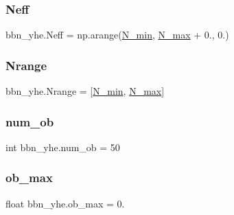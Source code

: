 \subsubsection{\texorpdfstring{Neff}{Neff}}
{\footnotesize\ttfamily bbn\+\_\+yhe.\+Neff = np.\+arange(\mbox{\hyperlink{namespacebbn__yhe_a12d17f1eceb939479da944d753f67417}{N\+\_\+min}}, \mbox{\hyperlink{namespacebbn__yhe_a97d4d46b2f4aad7933899daacdfa4e8d}{N\+\_\+max}} + 0., 0.)}

\mbox{\label{namespacebbn__yhe_aaa4728644822d8c49e68fadd68ede623}} 
\subsubsection{\texorpdfstring{Nrange}{Nrange}}
{\footnotesize\ttfamily bbn\+\_\+yhe.\+Nrange = \mbox{[}\mbox{\hyperlink{namespacebbn__yhe_a12d17f1eceb939479da944d753f67417}{N\+\_\+min}}, \mbox{\hyperlink{namespacebbn__yhe_a97d4d46b2f4aad7933899daacdfa4e8d}{N\+\_\+max}}\mbox{]}}

\mbox{\label{namespacebbn__yhe_a3aa1ae9b0ed6bd135e4fc002b7eca1a9}} 
\subsubsection{\texorpdfstring{num\+\_\+ob}{num\_ob}}
{\footnotesize\ttfamily int bbn\+\_\+yhe.\+num\+\_\+ob = 50}

\mbox{\label{namespacebbn__yhe_a7ad9cbb8dc27628c6fbf6296bba963ca}} 
\subsubsection{\texorpdfstring{ob\+\_\+max}{ob\_max}}
{\footnotesize\ttfamily float bbn\+\_\+yhe.\+ob\+\_\+max = 0.}

\mbox{\label{namespacebbn__yhe_aa005d4473664db0db345095282beb1ef}} 
